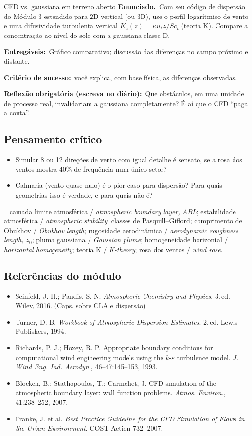 \documentclass[10pt,a4paper,twocolumn,openany]{report}
\newcommand{\lead}[2]{\par\medskip\noindent{\color{#1}\bfseries #2}\ }
\newenvironment{critico}{\subsection*{\textcolor{roxo}{Pensamento crítico}}}{\par}
\newenvironment{chaves}{\lead{cinza}{Palavras-chave (PT/EN):}\small}{\par}
\newenvironment{refs}{\subsection*{Referências do módulo}\small}{\par}
\newcommand{\enunciado}{\noindent\textbf{Enunciado.}\ }
\newcommand{\entregaveis}{\par\medskip\noindent\textbf{Entregáveis:}}
\newcommand{\criterio}{\par\medskip\noindent\textbf{Critério de sucesso:}\ }
\newcommand{\reflexao}{\par\medskip\noindent\textbf{Reflexão obrigatória (escreva no diário):}}
\begin{document}
\begin{tarefa}{CFD vs. gaussiana em terreno aberto}
\enunciado Com seu código de dispersão do Módulo 3 estendido para 2D
vertical (ou 3D), use o perfil logarítmico de vento e uma difusividade
turbulenta vertical $K_z(z)=\kappa u_* z/Sc_t$ (teoria K). Compare a
concentração ao nível do solo com a gaussiana classe D.
\entregaveis\ Gráfico comparativo; discussão das diferenças no campo próximo
e distante.
\criterio você explica, com base física, as diferenças observadas.
\reflexao\ Que obstáculos, em uma unidade de processo real, invalidariam a
gaussiana completamente? É aí que o CFD ``paga a conta''.
\end{tarefa}

\begin{critico}
\begin{itemize}
  \item Simular 8 ou 12 direções de vento com igual detalhe é sensato, se a
        rosa dos ventos mostra 40\% de frequência num único setor?
  \item Calmaria (vento quase nulo) é o pior caso para dispersão? Para quais
        geometrias isso é verdade, e para quais não é?
\end{itemize}
\end{critico}

\begin{chaves}
camada limite atmosférica / \emph{atmospheric boundary layer, ABL};
estabilidade atmosférica / \emph{atmospheric stability}; classes de
Pasquill--Gifford; comprimento de Obukhov / \emph{Obukhov length}; rugosidade
aerodinâmica / \emph{aerodynamic roughness length, $z_0$}; pluma gaussiana /
\emph{Gaussian plume}; homogeneidade horizontal / \emph{horizontal homogeneity};
teoria K / \emph{K-theory}; rosa dos ventos / \emph{wind rose}.
\end{chaves}

\begin{refs}
\begin{itemize}
  \item Seinfeld, J. H.; Pandis, S. N. \emph{Atmospheric Chemistry and Physics}. 3.\,ed. Wiley, 2016. (Caps. sobre CLA e dispersão)
  \item Turner, D. B. \emph{Workbook of Atmospheric Dispersion Estimates}. 2.\,ed. Lewis Publishers, 1994.
  \item Richards, P. J.; Hoxey, R. P. Appropriate boundary conditions for computational wind engineering models using the $k$-$\varepsilon$ turbulence model. \emph{J. Wind Eng. Ind. Aerodyn.}, 46--47:145--153, 1993.
  \item Blocken, B.; Stathopoulos, T.; Carmeliet, J. CFD simulation of the atmospheric boundary layer: wall function problems. \emph{Atmos. Environ.}, 41:238--252, 2007.
  \item Franke, J. et al. \emph{Best Practice Guideline for the CFD Simulation of Flows in the Urban Environment}. COST Action 732, 2007.
\end{itemize}
\end{refs}
\end{document}

